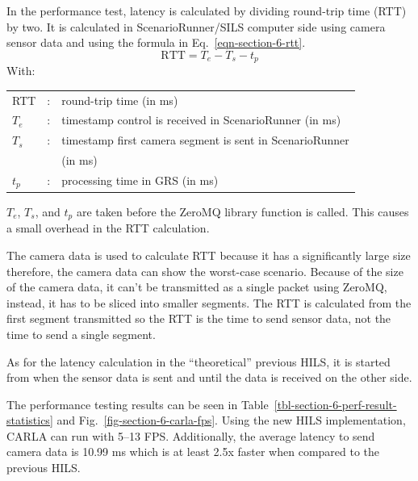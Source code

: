 In the performance test, latency is calculated by dividing round-trip time (RTT) by two.
It is calculated in ScenarioRunner/SILS computer side using camera sensor data
and using the formula in Eq.~\ref{eqn-section-6-rtt}.
\begin{equation}
	\label{eqn-section-6-rtt}
	\text{RTT} = T_{e} - T_{s} - t_p
\end{equation}
With:
\begin{table}[!h]
	\begin{tabular}{l l l}
		RTT     & : & round-trip time (in ms)                                  \\
		$T_{e}$ & : & timestamp control is received in ScenarioRunner (in ms)  \\
		$T_{s}$ & : & timestamp first camera segment is sent in ScenarioRunner \\
		        &   & (in ms)                                                  \\
		$t_p$   & : & processing time in GRS (in ms)
	\end{tabular}
\end{table}

$T_e$, $T_s$, and $t_p$ are taken before the ZeroMQ library function is called.
This causes a small overhead in the RTT calculation.

The camera data is used to calculate RTT because it has a significantly large
size therefore, the camera data can show the worst-case scenario. Because of the
size of the camera data, it can't be transmitted as a single packet using
ZeroMQ, instead, it has to be sliced into smaller segments. The RTT is
calculated from the first segment transmitted so the RTT is the time to send
sensor data, not the time to send a single segment.

As for the latency calculation in the ``theoretical'' previous HILS, it is
started from when the sensor data is sent and until the data is received on the
other side.

The performance testing results can be seen in
Table~\ref{tbl-section-6-perf-result-statistics} and
Fig.~\ref{fig-section-6-carla-fps}. Using the new HILS implementation, CARLA can
run with 5--13 FPS. Additionally, the average latency to send camera data is
10.99 ms which is at least 2.5x faster when compared to the previous HILS.

